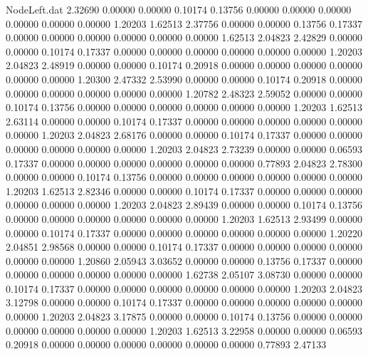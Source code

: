 \begin{filecontents}{NodeLeft.dat}
   2.32690    0.00000    0.00000     0.10174    0.13756    0.00000    0.00000    0.00000    0.00000    0.00000    0.00000    1.20203    1.62513
   2.37756    0.00000    0.00000     0.13756    0.17337    0.00000    0.00000    0.00000    0.00000    0.00000    0.00000    1.62513    2.04823
   2.42829    0.00000    0.00000     0.10174    0.17337    0.00000    0.00000    0.00000    0.00000    0.00000    0.00000    1.20203    2.04823
   2.48919    0.00000    0.00000     0.10174    0.20918    0.00000    0.00000    0.00000    0.00000    0.00000    0.00000    1.20300    2.47332
   2.53990    0.00000    0.00000     0.10174    0.20918    0.00000    0.00000    0.00000    0.00000    0.00000    0.00000    1.20782    2.48323
   2.59052    0.00000    0.00000     0.10174    0.13756    0.00000    0.00000    0.00000    0.00000    0.00000    0.00000    1.20203    1.62513
   2.63114    0.00000    0.00000     0.10174    0.17337    0.00000    0.00000    0.00000    0.00000    0.00000    0.00000    1.20203    2.04823
   2.68176    0.00000    0.00000     0.10174    0.17337    0.00000    0.00000    0.00000    0.00000    0.00000    0.00000    1.20203    2.04823
   2.73239    0.00000    0.00000     0.06593    0.17337    0.00000    0.00000    0.00000    0.00000    0.00000    0.00000    0.77893    2.04823
   2.78300    0.00000    0.00000     0.10174    0.13756    0.00000    0.00000    0.00000    0.00000    0.00000    0.00000    1.20203    1.62513
   2.82346    0.00000    0.00000     0.10174    0.17337    0.00000    0.00000    0.00000    0.00000    0.00000    0.00000    1.20203    2.04823
   2.89439    0.00000    0.00000     0.10174    0.13756    0.00000    0.00000    0.00000    0.00000    0.00000    0.00000    1.20203    1.62513
   2.93499    0.00000    0.00000     0.10174    0.17337    0.00000    0.00000    0.00000    0.00000    0.00000    0.00000    1.20220    2.04851
   2.98568    0.00000    0.00000     0.10174    0.17337    0.00000    0.00000    0.00000    0.00000    0.00000    0.00000    1.20860    2.05943
   3.03652    0.00000    0.00000     0.13756    0.17337    0.00000    0.00000    0.00000    0.00000    0.00000    0.00000    1.62738    2.05107
   3.08730    0.00000    0.00000     0.10174    0.17337    0.00000    0.00000    0.00000    0.00000    0.00000    0.00000    1.20203    2.04823
   3.12798    0.00000    0.00000     0.10174    0.17337    0.00000    0.00000    0.00000    0.00000    0.00000    0.00000    1.20203    2.04823
   3.17875    0.00000    0.00000     0.10174    0.13756    0.00000    0.00000    0.00000    0.00000    0.00000    0.00000    1.20203    1.62513
   3.22958    0.00000    0.00000     0.06593    0.20918    0.00000    0.00000    0.00000    0.00000    0.00000    0.00000    0.77893    2.47133

\end{filecontents}
